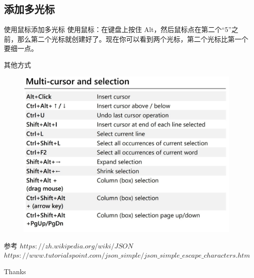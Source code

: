 \documentclass{beamer}
\begin{document}
\subsection{添加多光标}
\begin{frame}{使用鼠标添加多光标}
    \centering 使用鼠标：在键盘上按住 Alt，然后鼠标点在第二个“5”之前，那么第二个光标就创建好了。现在你可以看到两个光标，第二个光标比第一个要细一点。
\end{frame}

\begin{frame}{其他方式}
    \begin{figure}
        \includegraphics[scale=0.4]{pic/multi.jpg}
    \end{figure}
\end{frame}

\begin{frame}{参考}
    \small
    $https://zh.wikipedia.org/wiki/JSON$\\
    $https://www.tutorialspoint.com/json\_simple/json\_simple\_escape\_characters.htm$
\end{frame}

\begin{frame}
    \begin{center}
        {\Huge\calligra Thanks}
    \end{center}
\end{frame}
\end{document}

